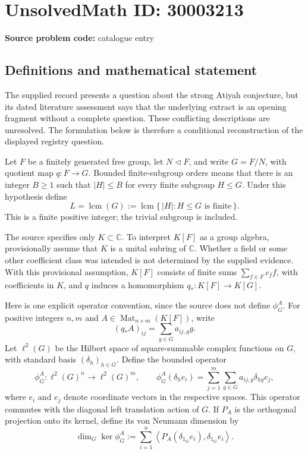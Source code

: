\documentclass[11pt]{article}
\newcommand{\C}{\mathbb{C}}
\begin{document}
\section*{UnsolvedMath ID: 30003213}
\textbf{Source problem code:} catalogue entry
\subsection{Definitions and mathematical statement}
The supplied record presents a question about the strong Atiyah conjecture, but its dated literature assessment says that the underlying extract is an opening fragment without a complete question. These conflicting descriptions are unresolved. The formulation below is therefore a conditional reconstruction of the displayed registry question.

Let \(F\) be a finitely generated free group, let \(N\triangleleft F\), and write \(G=F/N\), with quotient map \(q:F\to G\). Bounded finite-subgroup orders means that there is an integer \(B\geq 1\) such that \(|H|\leq B\) for every finite subgroup \(H\leq G\). Under this hypothesis define
\[
L=\operatorname{lcm}(G):=\operatorname{lcm}\{\,|H|:H\leq G\text{ is finite}\,\}.
\]
This is a finite positive integer; the trivial subgroup is included.

The source specifies only \(K\subset\C\). To interpret \(K[F]\) as a group algebra, provisionally assume that \(K\) is a unital subring of \(\C\). Whether a field or some other coefficient class was intended is not determined by the supplied evidence. With this provisional assumption, \(K[F]\) consists of finite sums \(\sum_{f\in F}c_f f\), with coefficients in \(K\), and \(q\) induces a homomorphism \(q_*:K[F]\to K[G]\).

Here is one explicit operator convention, since the source does not define \(\phi_G^A\). For positive integers \(n,m\) and \(A\in\operatorname{Mat}_{n\times m}(K[F])\), write
\[
(q_*A)_{ij}=\sum_{g\in G}a_{ij,g}g.
\]
Let \(\ell^2(G)\) be the Hilbert space of square-summable complex functions on \(G\), with standard basis \((\delta_h)_{h\in G}\). Define the bounded operator
\[
\phi_G^A:\ell^2(G)^n\longrightarrow\ell^2(G)^m,
\qquad
\phi_G^A(\delta_h e_i)=\sum_{j=1}^{m}\sum_{g\in G}a_{ij,g}\delta_{hg}e_j,
\]
where \(e_i\) and \(e_j\) denote coordinate vectors in the respective spaces. This operator commutes with the diagonal left translation action of \(G\). If \(P_A\) is the orthogonal projection onto its kernel, define its von Neumann dimension by
\[
\dim_G\ker\phi_G^A
:=\sum_{i=1}^{n}\left\langle P_A(\delta_{1_G}e_i),\delta_{1_G}e_i\right\rangle.
\]
\end{document}

